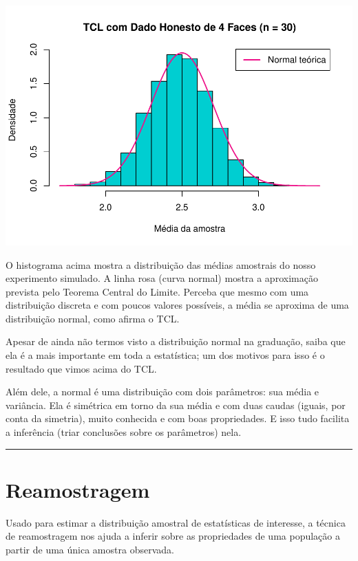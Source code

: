 \documentclass[
]{book}
\begin{document}
\begin{center}\includegraphics{AED_files/figure-latex/simulacao_tcl-1} \end{center}

O histograma acima mostra a distribuição das médias amostrais do nosso experimento simulado. A linha rosa (curva normal) mostra a aproximação prevista pelo Teorema Central do Limite. Perceba que mesmo com uma distribuição discreta e com poucos valores possíveis, a média se aproxima de uma distribuição normal, como afirma o TCL.

Apesar de ainda não termos visto a distribuição normal na graduação, saiba que ela é a mais importante em toda a estatística; um dos motivos para isso é o resultado que vimos acima do TCL.

Além dele, a normal é uma distribuição com dois parâmetros: sua média e variância. Ela é simétrica em torno da sua média e com duas caudas (iguais, por conta da simetria), muito conhecida e com boas propriedades. E isso tudo facilita a inferência (triar conclusões sobre os parâmetros) nela.

\begin{center}\rule{0.5\linewidth}{0.5pt}\end{center}

\section{Reamostragem}\label{reamostragem}

Usado para estimar a distribuição amostral de estatísticas de interesse, a técnica de reamostragem nos ajuda a inferir sobre as propriedades de uma população a partir de uma única amostra observada.
\end{document}
